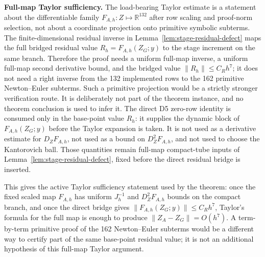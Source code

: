 \documentclass[preprint,12pt]{elsarticle}
\begin{document}
\noindent\textbf{Full-map Taylor sufficiency.}
The load-bearing Taylor estimate is a statement about the differentiable
family \(F_{A,h}:Z\mapsto\mathbb R^{132}\) after row scaling and proof-norm
selection, not about a coordinate projection onto primitive symbolic
subterms.  The finite-dimensional residual inverse in
Lemma~\ref{lem:stage-residual-defect} maps the full bridged residual value
\(R_h=F_{A,h}(Z_G;y)\) to the stage increment on the same branch.  Therefore
the proof needs a uniform full-map inverse, a uniform full-map second
derivative bound, and the bridged value \(\|R_h\|\le C_Rh^7\); it does not
need a right inverse from the 132 implemented rows to the 162 primitive
Newton--Euler subterms.  Such a primitive projection would be a
strictly stronger verification route.  It is deliberately not part of the theorem
instance, and no theorem conclusion is used to infer it.
The direct D5 zero-row identity is consumed only in the base-point value
\(R_h\): it supplies the dynamic block of
\(F_{A,h}(Z_G;y)\) before the Taylor expansion is taken.  It is not used as a
derivative estimate for \(D_ZF_{A,h}\), not used as a bound on
\(D_Z^2F_{A,h}\), and not used to choose the Kantorovich ball.  Those
quantities remain full-map compact-tube inputs of
Lemma~\ref{lem:stage-residual-defect}, fixed before the direct residual
bridge is inserted.

This gives the active Taylor sufficiency statement used by the theorem:
once the fixed scaled map \(F_{A,h}\) has uniform \(J_h^{-1}\) and
\(D_Z^2F_{A,h}\) bounds on the compact branch, and once the direct bridge
gives \(\|F_{A,h}(Z_G;y)\|\le C_Rh^7\), Taylor's formula for the full map is
enough to produce \(\|Z_A-Z_G\|=O(h^7)\).  A term-by-term primitive proof of
the 162 Newton--Euler subterms would be a different way to certify part of
the same base-point residual value; it is not an additional hypothesis of this
full-map Taylor argument.
\end{document}
